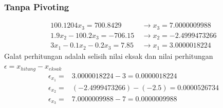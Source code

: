 \documentclass{beamer}
\begin{document}
\begin{frame}
\frametitle{Tanpa Pivoting}
\begin{equation}
\begin{split}
100.1204x_3 = 700.8429 \qquad&\rightarrow x_3=\boxed{7.0000009988}
\\1.9x_2-100.2x_3=-706.15 \  &\rightarrow x_2=\boxed{-2.4999473266}
\\3x_1-0.1x_2-0.2x_3=7.85 \  &\rightarrow x_1=\boxed{3.0000018224}
\end{split}
\nonumber
\end{equation}
Galat perhitungan adalah selisih nilai eksak dan nilai perhitungan\\$\epsilon=x_{hitung}-x_{eksak}$ 
\begin{equation}
\begin{split}
\epsilon_{x_1}=& 3.0000018224-3 = 0.0000018224
\\\epsilon_{x_2}=& (-2.4999473266)-(-2.5) = 0.0000526734
\\\epsilon_{x_3}=& 7.0000009988-7 = 0.0000009988
\end{split}
\nonumber
\end{equation}

\end{frame}
\end{document}
